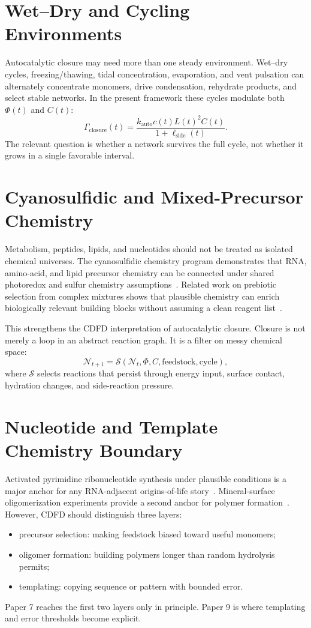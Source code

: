 \documentclass[11pt,a4paper]{article}
\begin{document}
\section{Wet--Dry and Cycling Environments}
Autocatalytic closure may need more than one steady environment. Wet--dry cycles, freezing/thawing, tidal concentration, evaporation, and vent pulsation can alternately concentrate monomers, drive condensation, rehydrate products, and select stable networks. In the present framework these cycles modulate both $\Phi(t)$ and $C(t)$:
\begin{equation}
\Gamma_{\mathrm{closure}}(t)
=
\frac{k_{\mathrm{auto}}c(t)L(t)^2 C(t)}
{1+\ell_{\mathrm{side}}(t)}.
\end{equation}
The relevant question is whether a network survives the full cycle, not whether it grows in a single favorable interval.

\section{Cyanosulfidic and Mixed-Precursor Chemistry}
Metabolism, peptides, lipids, and nucleotides should not be treated as isolated chemical universes. The cyanosulfidic chemistry program demonstrates that RNA, amino-acid, and lipid precursor chemistry can be connected under shared photoredox and sulfur chemistry assumptions~\cite{Patel2015}. Related work on prebiotic selection from complex mixtures shows that plausible chemistry can enrich biologically relevant building blocks without assuming a clean reagent list~\cite{Islam2017}.

This strengthens the CDFD interpretation of autocatalytic closure. Closure is not merely a loop in an abstract reaction graph. It is a filter on messy chemical space:
\begin{equation}
\mathcal{N}_{t+1}
=
\mathcal{S}\!\left(\mathcal{N}_t,\Phi,C,\mathrm{feedstock},\mathrm{cycle}\right),
\end{equation}
where $\mathcal{S}$ selects reactions that persist through energy input, surface contact, hydration changes, and side-reaction pressure.

\section{Nucleotide and Template Chemistry Boundary}
Activated pyrimidine ribonucleotide synthesis under plausible conditions is a major anchor for any RNA-adjacent origins-of-life story~\cite{Powner2009}. Mineral-surface oligomerization experiments provide a second anchor for polymer formation~\cite{Ferris1996}. However, CDFD should distinguish three layers:
\begin{itemize}
\item precursor selection: making feedstock biased toward useful monomers;
\item oligomer formation: building polymers longer than random hydrolysis permits;
\item templating: copying sequence or pattern with bounded error.
\end{itemize}
Paper 7 reaches the first two layers only in principle. Paper 9 is where templating and error thresholds become explicit.
\end{document}
